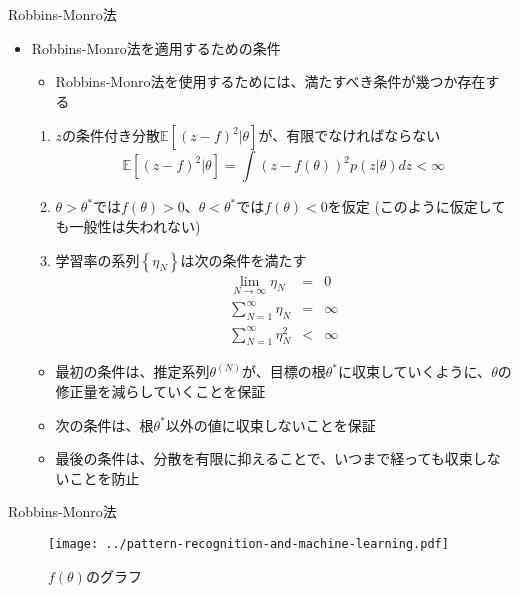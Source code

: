 \documentclass[dvipdfmx,notheorems,t]{beamer}
\begin{document}
\begin{frame}{Robbins-Monro法}

\begin{itemize}
	\item Robbins-Monro法を適用するための条件
	\begin{itemize}
		\item Robbins-Monro法を使用するためには、満たすべき条件が幾つか存在する
	\end{itemize}
	\begin{enumerate}
		\item $z$の条件付き分散$\mathbb{E} \left[ (z - f)^2 | \theta \right]$が、有限でなければならない
		\begin{equation}
			\mathbb{E} \left[ (z - f)^2 | \theta \right] = \int (z - f(\theta))^2 p(z | \theta) dz < \infty
		\end{equation}
		\item $\theta > \theta^*$では$f(\theta) > 0$、$\theta < \theta^*$では$f(\theta) < 0$を仮定 (このように仮定しても一般性は失われない)
		\item 学習率の系列$\left\{ \eta_{N} \right\}$は次の条件を満たす
		\begin{eqnarray}
			\lim_{N \to \infty} \eta_{N} &=& 0 \\
			\sum_{N = 1}^\infty \eta_{N} &=& \infty \\
			\sum_{N = 1}^\infty \eta_{N}^2 &<& \infty
		\end{eqnarray}
	\end{enumerate}
	\begin{itemize}
		\item 最初の条件は、推定系列$\theta^{(N)}$が、目標の根$\theta^*$に収束していくように、$\theta$の修正量を減らしていくことを保証
		\item 次の条件は、根$\theta^*$以外の値に収束しないことを保証
		\item 最後の条件は、分散を有限に抑えることで、いつまで経っても収束しないことを防止
	\end{itemize}
\end{itemize}

\end{frame}

\begin{frame}{Robbins-Monro法}

\begin{figure}[h]
	\centering
	\texttt{[image: ../pattern-recognition-and-machine-learning.pdf]}
	\caption{$f(\theta)$のグラフ}
\end{figure}

\end{frame}
\end{document}
